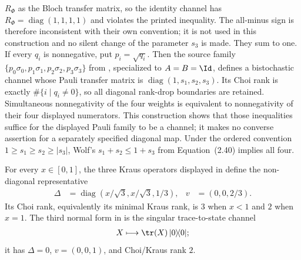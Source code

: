 \begin{theorem}
    $R_\Phi$ as the Bloch transfer matrix, so the identity channel has
    $R_\Phi=\operatorname{diag}(1,1,1,1)$ and violates the printed inequality.
    The all-minus sign is therefore inconsistent with their own convention;
    it is not used in this construction and no silent change of the parameter
    $s_3$ is made.
    They sum to one.  If every $q_i$ is nonnegative, put $p_i=\sqrt{q_i}$.
    Then the source family
    $\{p_0\sigma_0,p_1\sigma_1,p_2\sigma_2,p_3\sigma_3\}$ from
    \cite[Theorem~8, Eq.~(18)]{VerstraeteVerschelde2002QuantumChannels},
    specialized to $A=B=\Id$, defines a
    bistochastic channel whose Pauli transfer matrix is
    $\operatorname{diag}(1,s_1,s_2,s_3)$.  Its Choi rank is exactly
    $\#\{i\mid q_i\ne0\}$, so all diagonal rank-drop boundaries are retained.
    Simultaneous nonnegativity of the four weights is equivalent to
    nonnegativity of their four displayed numerators.  This construction shows
    that those inequalities suffice for the displayed Pauli family to be a
    channel; it makes no converse assertion for a separately specified
    diagonal map.
    Under the ordered convention
    $1\geq s_1\geq s_2\geq\lvert s_3\rvert$, Wolf's
    $s_1+s_2\leq1+s_3$ from Equation~(2.40) implies all four.

    For every $x\in[0,1]$, the three Kraus operators displayed in
    \cite[Theorem~8, Eq.~(19)]{VerstraeteVerschelde2002QuantumChannels}
    define the non-diagonal representative
    \begin{align}
        \Delta
        &=\operatorname{diag}(x/\sqrt{3},x/\sqrt{3},1/3),
        &v&=(0,0,2/3).
    \end{align}
    Its Choi rank, equivalently its minimal Kraus rank, is $3$ when
    $x<1$ and $2$ when $x=1$.  The third normal form in
    \cite[Theorem~8, Eq.~(17)]{VerstraeteVerschelde2002QuantumChannels}
    is the singular trace-to-state channel
    \begin{align}
        X\longmapsto \tr(X)\,\lvert0\rangle\!\langle0\rvert;
    \end{align}
    it has $\Delta=0$, $v=(0,0,1)$, and Choi/Kraus rank $2$.


\end{theorem}
